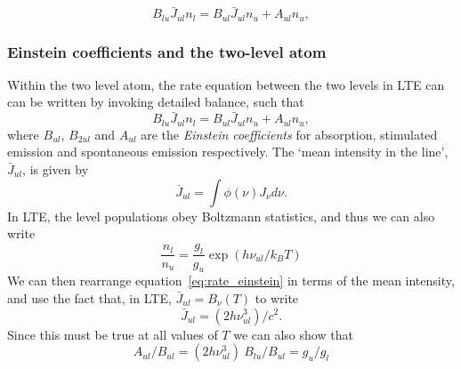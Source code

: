 \begin{equation}
B_{lu} \bar{J}_{ul} n_l = B_{ul} \bar{J}_{ul} n_u + A_{ul} n_u,
\label{eq:rate_einstein}
\end{equation}




\subsubsection{Einstein coefficients and the two-level atom}

Within the two level atom, the rate equation between the two levels in LTE can
can be written by invoking detailed balance, such that 
\begin{equation}
B_{lu} \bar{J}_{ul} n_l = B_{ul} \bar{J}_{ul} n_u + A_{ul} n_u,
\label{eq:rate_einstein}
\end{equation}
where $B_{ul}$, $B_{2ul}$ and $A_{ul}$ are the {\em Einstein coefficients}
for absorption, stimulated emission and spontaneous emission respectively.
The `mean intensity in the line', $\bar{J}_{ul}$, is given by
\begin{equation}
\bar{J}_{ul} = \int \phi(\nu) J_\nu d\nu.
\label{eq:jbar}
\end{equation}
In LTE, the level populations obey Boltzmann statistics, and thus we can also
write
\begin{equation}
\frac{n_l}{n_u} = \frac{g_l}{g_u} \exp (h \nu_{ul} / k_B T)
\end{equation}
We can then rearrange equation~\ref{eq:rate_einstein} in terms of the mean intensity,
and use the fact that, in LTE, $\bar{J}_{ul} = B_\nu (T)$ to write
\begin{equation}
\bar{J}_{ul} = (2 h \nu_{ul}^3) / c^2.
\end{equation}
Since this must be true at all values of $T$ we can also show that 
\begin{equation}
A_{ul} / B_{ul} = (2 h \nu_{ul}^3)~B_{lu} / B_{ul} = g_u / g_l
\end{equation}





